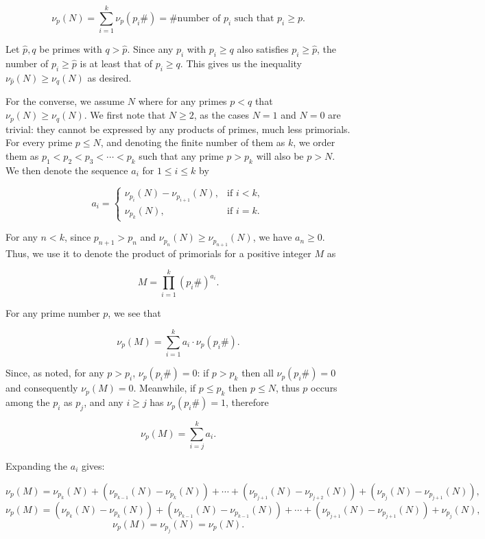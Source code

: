 \documentclass{article}
\begin{document}
\begin{enumerate}[leftmargin=*, label=\arabic*.]
\begin{enumerate}[label=\alph*)]
    \[
    \nu_p(N) = \sum_{i = 1}^k \nu_p(p_i \#)
    = \text{\# number of } p_i \text{ such that } p_i \ge p.
    \]
    
    Let \(\hat{p}, q\) be primes with \(q > \hat{p}\). Since any \(p_i\) with \(p_i \geq q\) also satisfies \(p_i \geq \hat{p}\), the number of \(p_i \geq \hat{p}\) is at least that of \(p_i \geq q\). This gives us the inequality \(\nu_{\hat{p}}(N) \geq \nu_{q}(N)\) as desired.
    
    \medskip
    
    For the converse, we assume $N$ where for any primes \(p < q\) that \(\nu_p(N) \geq \nu_q(N)\).  
    We first note that \(N \geq 2\), as the cases \(N = 1\) and \(N = 0\) are trivial: they cannot be expressed by any products of primes, much less primorials. For every prime \(p \leq N\), and denoting the finite number of them as \(k\), we order them as \(p_1 < p_2 < p_3 < \cdots < p_k\) such that any prime $p > p_k$ will also be $p > N$. We then denote the sequence \(a_i\) for \(1 \leq i \leq k\) by
    
    \[
    a_i =
    \begin{cases}
    \nu_{p_i}(N) - \nu_{p_{i+1}}(N), & \text{if } i < k,\\
    \nu_{p_k}(N), & \text{if } i = k.
    \end{cases}
    \]
    
    For any \(n < k\), since \(p_{n+1} > p_n\) and \(\nu_{p_n}(N) \ge \nu_{p_{n+1}}(N)\), we have \(a_n \ge 0\). Thus, we use it to denote the product of primorials for a positive integer \(M\) as 
    
    \[
    M = \prod_{i = 1}^k (p_i\#)^{a_i}.
    \]
    
    For any prime number \(p\), we see that
      
    \[
    \nu_p(M) = \sum_{i = 1}^k a_i \cdot \nu_p(p_i\#).
    \]
    
    Since, as noted, for any \(p > p_i\), \(\nu_p(p_i\#) = 0\): if \(p > p_k\) then all \(\nu_p(p_i\#) = 0\) and consequently \(\nu_p(M) = 0\). Meanwhile, if \(p \leq p_k\) then $p \leq N$, thus \(p\) occurs among the \(p_i\) as \(p_j\), and any \(i \geq j\) has \(\nu_p(p_i\#) = 1\), therefore 
    
    \[
    \nu_p(M) = \sum_{i = j}^k a_i.
    \]
    
    Expanding the \(a_i\) gives:
    
    $$
    \nu_p(M) = \nu_{p_k}(N) + (\nu_{p_{k-1}}(N) - \nu_{p_k}(N)) + \cdots + (\nu_{p_{j+1}}(N) - \nu_{p_{j+2}}(N)) + (\nu_{p_j}(N) - \nu_{p_{j+1}}(N)),
    $$
    $$
    \nu_p(M) = (\nu_{p_k}(N) - \nu_{p_k}(N)) + (\nu_{p_{k-1}}(N) - \nu_{p_{k-1}}(N)) + \cdots + (\nu_{p_{j+1}}(N) - \nu_{p_{j+1}}(N)) + \nu_{p_j}(N),
    $$
    $$
    \nu_p(M) = \nu_{p_j}(N) = \nu_{p}(N).
    $$ 
    

\end{enumerate}
\end{enumerate}
\end{document}
